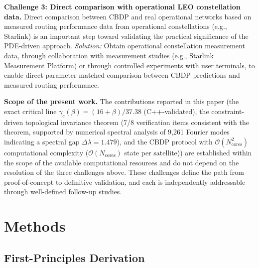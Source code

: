 \documentclass[sn-nature,pdflatex]{sn-jnl}
\begin{document}
\medskip
\noindent\textbf{Challenge 3: Direct comparison with operational LEO constellation data.} Direct comparison between CBDP and real operational networks based on measured routing performance data from operational constellations (e.g., Starlink) is an important step toward validating the practical significance of the PDE-driven approach.
\textit{Solution:} Obtain operational constellation measurement data, through collaboration with measurement studies (e.g., Starlink Measurement Platform) or through controlled experiments with user terminals, to enable direct parameter-matched comparison between CBDP predictions and measured routing performance.

\medskip
\noindent\textbf{Scope of the present work.}
The contributions reported in this paper (the exact critical line $\gamma_c(\beta) = (16+\beta)/37.38$ (C++-validated), the constraint-driven topological invariance theorem (7/8 verification items consistent with the theorem, supported by numerical spectral analysis of 9,261 Fourier modes indicating a spectral gap $\Delta\lambda = 1.479$), and the CBDP protocol with $\mathcal{O}(N_{\text{cores}}^2)$ computational complexity ($\mathcal{O}(N_{\text{cores}})$ state per satellite)) are established within the scope of the available computational resources and do not depend on the resolution of the three challenges above.
These challenges define the path from proof-of-concept to definitive validation, and each is independently addressable through well-defined follow-up studies.

\section{Methods}
\label{sec:methods}

\subsection{First-Principles Derivation}
\end{document}

